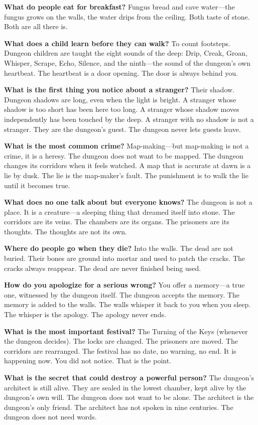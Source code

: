 \vspace{1em}

\begin{almanac}
\textbf{What do people eat for breakfast?} Fungus bread and cave water---the fungus grows on the walls, the water drips from the ceiling. Both taste of stone. Both are all there is.

\textbf{What does a child learn before they can walk?} To count footsteps. Dungeon children are taught the eight sounds of the deep: Drip, Creak, Groan, Whisper, Scrape, Echo, Silence, and the ninth---the sound of the dungeon's own heartbeat. The heartbeat is a door opening. The door is always behind you.

\textbf{What is the first thing you notice about a stranger?} Their shadow. Dungeon shadows are long, even when the light is bright. A stranger whose shadow is too short has been here too long. A stranger whose shadow moves independently has been touched by the deep. A stranger with no shadow is not a stranger. They are the dungeon's guest. The dungeon never lets guests leave.

\textbf{What is the most common crime?} Map-making---but map-making is not a crime, it is a heresy. The dungeon does not want to be mapped. The dungeon changes its corridors when it feels watched. A map that is accurate at dawn is a lie by dusk. The lie is the map-maker's fault. The punishment is to walk the lie until it becomes true.

\textbf{What does no one talk about but everyone knows?} The dungeon is not a place. It is a creature---a sleeping thing that dreamed itself into stone. The corridors are its veins. The chambers are its organs. The prisoners are its thoughts. The thoughts are not its own.

\textbf{Where do people go when they die?} Into the walls. The dead are not buried. Their bones are ground into mortar and used to patch the cracks. The cracks always reappear. The dead are never finished being used.

\textbf{How do you apologize for a serious wrong?} You offer a memory---a true one, witnessed by the dungeon itself. The dungeon accepts the memory. The memory is added to the walls. The walls whisper it back to you when you sleep. The whisper is the apology. The apology never ends.

\textbf{What is the most important festival?} The Turning of the Keys (whenever the dungeon decides). The locks are changed. The prisoners are moved. The corridors are rearranged. The festival has no date, no warning, no end. It is happening now. You did not notice. That is the point.

\textbf{What is the secret that could destroy a powerful person?} The dungeon's architect is still alive. They are sealed in the lowest chamber, kept alive by the dungeon's own will. The dungeon does not want to be alone. The architect is the dungeon's only friend. The architect has not spoken in nine centuries. The dungeon does not need words.
\end{almanac}

